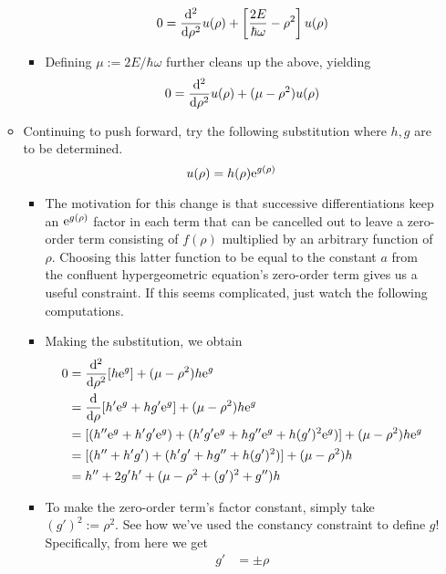 \documentclass[../finalProject.tex]{subfiles}
\begin{document}
\begin{itemize}
\begin{itemize}
\begin{itemize}
            \begin{equation*}
                0 = \dv[2]{\rho}u(\rho)+\left[ \frac{2E}{\hbar\omega}-\rho^2 \right]u(\rho)
            \end{equation*}
            \item Defining $\mu:=2E/\hbar\omega$ further cleans up the above, yielding
            \begin{equation*}
                0 = \dv[2]{\rho}u(\rho)+(\mu-\rho^2)u(\rho)
            \end{equation*}
        \end{itemize}
        \item Continuing to push forward, try the following substitution where $h,g$ are to be determined.
        \begin{equation*}
            u(\rho) = h(\rho)\e[g(\rho)]
        \end{equation*}
        \begin{itemize}
            \item The motivation for this change is that successive differentiations keep an $\e[g(\rho)]$ factor in each term that can be cancelled out to leave a zero-order term consisting of $f(\rho)$ multiplied by an arbitrary function of $\rho$. Choosing this latter function to be equal to the constant $a$ from the confluent hypergeometric equation's zero-order term gives us a useful constraint. If this seems complicated, just watch the following computations.
            \item Making the substitution, we obtain
            \begin{align*}
                0 &= \dv[2]{\rho}[h\e[g]]+(\mu-\rho^2)h\e[g]\\
                &= \dv{\rho}[h'\e[g]+hg'\e[g]]+(\mu-\rho^2)h\e[g]\\
                &= [(h''\e[g]+h'g'\e[g])+(h'g'\e[g]+hg''\e[g]+h(g')^2\e[g])]+(\mu-\rho^2)h\e[g]\\
                &= [(h''+h'g')+(h'g'+hg''+h(g')^2)]+(\mu-\rho^2)h\\
                &= h''+2g'h'+(\mu-\rho^2+(g')^2+g'')h
            \end{align*}
            \item To make the zero-order term's factor constant, simply take $(g')^2:=\rho^2$. See how we've used the constancy constraint to define $g$! Specifically, from here we get
            \begin{align*}
                g' &= \pm\rho\\

\end{align*}
\end{itemize}
\end{itemize}
\end{itemize}
\end{document}
